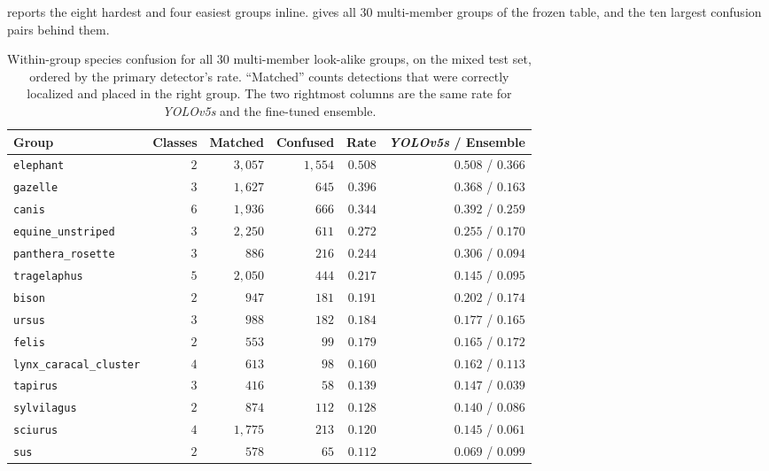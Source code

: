  reports the eight hardest and four easiest groups inline.  gives all $30$ multi-member groups of the frozen table, and  the ten largest confusion pairs behind them.

\begin{table}[htbp]
\centering
\caption[Within-group confusion rate per look-alike group]{Within-group species confusion for all $30$ multi-member look-alike groups, on the mixed test set, ordered by the primary detector's rate. \enquote{Matched} counts detections that were correctly localized and placed in the right group. The two rightmost columns are the same rate for \textit{YOLOv5s} and the fine-tuned ensemble.}
\label{tab:lookalike-group-confusion}
\small
\begin{tabular}{@{}lrrrrr@{}}
\toprule
Group & Classes & Matched & Confused & Rate & \textit{YOLOv5s} / Ensemble \\
\midrule
\texttt{elephant} & $2$ & $3{,}057$ & $1{,}554$ & $0.508$ & $0.508$ / $0.366$ \\
\texttt{gazelle} & $3$ & $1{,}627$ & $645$ & $0.396$ & $0.368$ / $0.163$ \\
\texttt{canis} & $6$ & $1{,}936$ & $666$ & $0.344$ & $0.392$ / $0.259$ \\
\texttt{equine\_unstriped} & $3$ & $2{,}250$ & $611$ & $0.272$ & $0.255$ / $0.170$ \\
\texttt{panthera\_rosette} & $3$ & $886$ & $216$ & $0.244$ & $0.306$ / $0.094$ \\
\texttt{tragelaphus} & $5$ & $2{,}050$ & $444$ & $0.217$ & $0.145$ / $0.095$ \\
\texttt{bison} & $2$ & $947$ & $181$ & $0.191$ & $0.202$ / $0.174$ \\
\texttt{ursus} & $3$ & $988$ & $182$ & $0.184$ & $0.177$ / $0.165$ \\
\texttt{felis} & $2$ & $553$ & $99$ & $0.179$ & $0.165$ / $0.172$ \\
\texttt{lynx\_caracal\_cluster} & $4$ & $613$ & $98$ & $0.160$ & $0.162$ / $0.113$ \\
\texttt{tapirus} & $3$ & $416$ & $58$ & $0.139$ & $0.147$ / $0.039$ \\
\texttt{sylvilagus} & $2$ & $874$ & $112$ & $0.128$ & $0.140$ / $0.086$ \\
\texttt{sciurus} & $4$ & $1{,}775$ & $213$ & $0.120$ & $0.145$ / $0.061$ \\
\texttt{sus} & $2$ & $578$ & $65$ & $0.112$ & $0.069$ / $0.099$ \\

\end{tabular}
\end{table}
